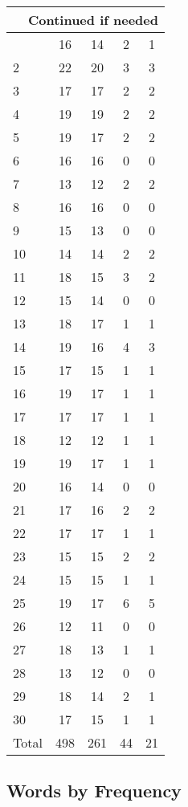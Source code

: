 \begin{center}
\begin{longtable}{l|c|c|c|c}
\hline \multicolumn{5}{|r|}{{Continued if needed}} \\ \hline
\endfoot 
1 & 16 & 14 & 2 & 1\\ \hline
2 & 22 & 20 & 3 & 3\\ \hline
3 & 17 & 17 & 2 & 2\\ \hline
4 & 19 & 19 & 2 & 2\\ \hline
5 & 19 & 17 & 2 & 2\\ \hline
6 & 16 & 16 & 0 & 0\\ \hline
7 & 13 & 12 & 2 & 2\\ \hline
8 & 16 & 16 & 0 & 0\\ \hline
9 & 15 & 13 & 0 & 0\\ \hline
10 & 14 & 14 & 2 & 2\\ \hline
11 & 18 & 15 & 3 & 2\\ \hline
12 & 15 & 14 & 0 & 0\\ \hline
13 & 18 & 17 & 1 & 1\\ \hline
14 & 19 & 16 & 4 & 3\\ \hline
15 & 17 & 15 & 1 & 1\\ \hline
16 & 19 & 17 & 1 & 1\\ \hline
17 & 17 & 17 & 1 & 1\\ \hline
18 & 12 & 12 & 1 & 1\\ \hline
19 & 19 & 17 & 1 & 1\\ \hline
20 & 16 & 14 & 0 & 0\\ \hline
21 & 17 & 16 & 2 & 2\\ \hline
22 & 17 & 17 & 1 & 1\\ \hline
23 & 15 & 15 & 2 & 2\\ \hline
24 & 15 & 15 & 1 & 1\\ \hline
25 & 19 & 17 & 6 & 5\\ \hline
26 & 12 & 11 & 0 & 0\\ \hline
27 & 18 & 13 & 1 & 1\\ \hline
28 & 13 & 12 & 0 & 0\\ \hline
29 & 18 & 14 & 2 & 1\\ \hline
30 & 17 & 15 & 1 & 1\\ \hline
\hline \hline
Total & 498 & 261 & 44 & 21




\end{longtable}
\end{center}



\subsection{Words by Frequency}

